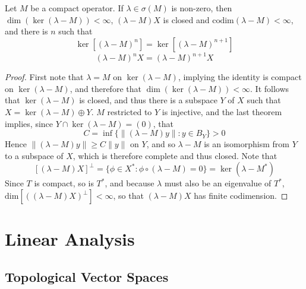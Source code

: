 \begin{corollary}
    Let $M$ be a compact operator. If $\lambda \in \sigma(M)$ is non-zero, then $\dim(\ker(\lambda - M)) < \infty$, $(\lambda - M)X$ is closed and $\text{codim}(\lambda - M) < \infty$, and there is $n$ such that
    \[ \ker[(\lambda - M)^n] = \ker[(\lambda - M)^{n+1}] \]
    \[ (\lambda - M)^n X = (\lambda - M)^{n+1} X \]
\end{corollary}
\begin{proof}
    First note that $\lambda = M$ on $\ker(\lambda - M)$, implying the identity is compact on $\ker(\lambda - M)$, and therefore that $\dim(\ker(\lambda - M)) < \infty$. It follows that $\ker(\lambda - M)$ is closed, and thus there is a subspace $Y$ of $X$ such that $X = \ker(\lambda - M) \oplus Y$. $M$ restricted to $Y$ is injective, and the last theorem implies, since $Y \cap \ker(\lambda - M) = (0)$, that
    \[ C = \inf \{ \| (\lambda - M)y \| : y \in B_Y \} > 0 \]
    Hence $\| (\lambda - M)y \| \geq C \|y\|$ on $Y$, and so $\lambda - M$ is an isomorphism from $Y$ to a subspace of $X$, which is therefore complete and thus closed. Note that
    \[ [(\lambda - M)X]^\perp = \{ \phi \in X^*: \phi \circ (\lambda - M) = 0 \} = \ker( \lambda - M^*) \]
    Since $T$ is compact, so is $T^*$, and because $\lambda$ must also be an eigenvalue of $T^*$, $\text{dim}[((\lambda - M)X)^\perp] < \infty$, so that $(\lambda - M)X$ has finite codimension.
\end{proof}









\part{Linear Analysis}

\chapter{Topological Vector Spaces}

